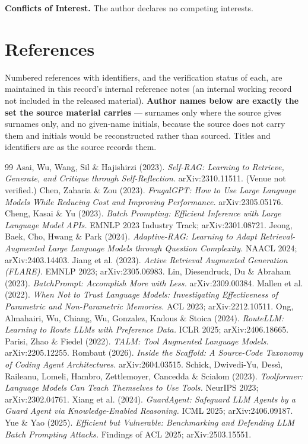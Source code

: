 \documentclass[10pt]{article}
\begin{document}
\textbf{Conflicts of Interest.} The author declares no competing interests.

\section*{References}
Numbered references with identifiers, and the verification status of each, are maintained in this record's internal reference notes (an internal working record not included in the released material). \textbf{Author names below are exactly the set the source material carries} --- surnames only where the source gives surnames only, and no given-name initials, because the source does not carry them and initials would be reconstructed rather than sourced. Titles and identifiers are as the source records them.

\renewcommand{\refname}{}   %
\begin{thebibliography}{99}
 Asai, Wu, Wang, Sil \& Hajishirzi (2023). \emph{Self-RAG: Learning to Retrieve, Generate, and Critique through Self-Reflection.} arXiv:2310.11511. (Venue not verified.)
 Chen, Zaharia \& Zou (2023). \emph{FrugalGPT: How to Use Large Language Models While Reducing Cost and Improving Performance.} arXiv:2305.05176.
 Cheng, Kasai \& Yu (2023). \emph{Batch Prompting: Efficient Inference with Large Language Model APIs.} EMNLP 2023 Industry Track; arXiv:2301.08721.
 Jeong, Baek, Cho, Hwang \& Park (2024). \emph{Adaptive-RAG: Learning to Adapt Retrieval-Augmented Large Language Models through Question Complexity.} NAACL 2024; arXiv:2403.14403.
 Jiang et al. (2023). \emph{Active Retrieval Augmented Generation (FLARE).} EMNLP 2023; arXiv:2305.06983.
 Lin, Diesendruck, Du \& Abraham (2023). \emph{BatchPrompt: Accomplish More with Less.} arXiv:2309.00384.
 Mallen et al. (2022). \emph{When Not to Trust Language Models: Investigating Effectiveness of Parametric and Non-Parametric Memories.} ACL 2023; arXiv:2212.10511.
 Ong, Almahairi, Wu, Chiang, Wu, Gonzalez, Kadous \& Stoica (2024). \emph{RouteLLM: Learning to Route LLMs with Preference Data.} ICLR 2025; arXiv:2406.18665.
 Parisi, Zhao \& Fiedel (2022). \emph{TALM: Tool Augmented Language Models.} arXiv:2205.12255.
 Rombaut (2026). \emph{Inside the Scaffold: A Source-Code Taxonomy of Coding Agent Architectures.} arXiv:2604.03515.
 Schick, Dwivedi-Yu, Dess\`i, Raileanu, Lomeli, Hambro, Zettlemoyer, Cancedda \& Scialom (2023). \emph{Toolformer: Language Models Can Teach Themselves to Use Tools.} NeurIPS 2023; arXiv:2302.04761.
 Xiang et al. (2024). \emph{GuardAgent: Safeguard LLM Agents by a Guard Agent via Knowledge-Enabled Reasoning.} ICML 2025; arXiv:2406.09187.
 Yue \& Yao (2025). \emph{Efficient but Vulnerable: Benchmarking and Defending LLM Batch Prompting Attacks.} Findings of ACL 2025; arXiv:2503.15551.
\end{thebibliography}
\end{document}
